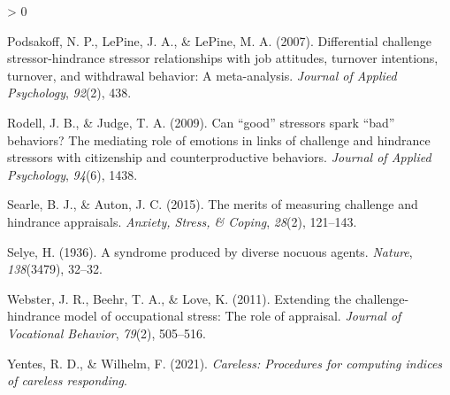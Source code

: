 \documentclass[
  english,
  man]{apa6}
\newlength{\cslhangindent}
\newenvironment{CSLReferences}[2] %
 {%
  \setlength{\parindent}{0pt}
  \ifodd #1 \everypar{\setlength{\hangindent}{\cslhangindent}}\ignorespaces\fi
  \ifnum #2 > 0
  \setlength{\parskip}{#2\baselineskip}
  \fi
 }%
 {}
\begin{document}
\begin{CSLReferences}{1}{0}
\leavevmode\hypertarget{ref-podsakoff2007differential}{}%
Podsakoff, N. P., LePine, J. A., \& LePine, M. A. (2007). Differential challenge stressor-hindrance stressor relationships with job attitudes, turnover intentions, turnover, and withdrawal behavior: A meta-analysis. \emph{Journal of Applied Psychology}, \emph{92}(2), 438.

\leavevmode\hypertarget{ref-rodell2009can}{}%
Rodell, J. B., \& Judge, T. A. (2009). Can {``good''} stressors spark {``bad''} behaviors? The mediating role of emotions in links of challenge and hindrance stressors with citizenship and counterproductive behaviors. \emph{Journal of Applied Psychology}, \emph{94}(6), 1438.

\leavevmode\hypertarget{ref-searle2015merits}{}%
Searle, B. J., \& Auton, J. C. (2015). The merits of measuring challenge and hindrance appraisals. \emph{Anxiety, Stress, \& Coping}, \emph{28}(2), 121--143.

\leavevmode\hypertarget{ref-selye1936syndrome}{}%
Selye, H. (1936). A syndrome produced by diverse nocuous agents. \emph{Nature}, \emph{138}(3479), 32--32.

\leavevmode\hypertarget{ref-webster2011extending}{}%
Webster, J. R., Beehr, T. A., \& Love, K. (2011). Extending the challenge-hindrance model of occupational stress: The role of appraisal. \emph{Journal of Vocational Behavior}, \emph{79}(2), 505--516.

\leavevmode\hypertarget{ref-R-careless}{}%
Yentes, R. D., \& Wilhelm, F. (2021). \emph{Careless: Procedures for computing indices of careless responding}.

\end{CSLReferences}

\endgroup
\end{document}
